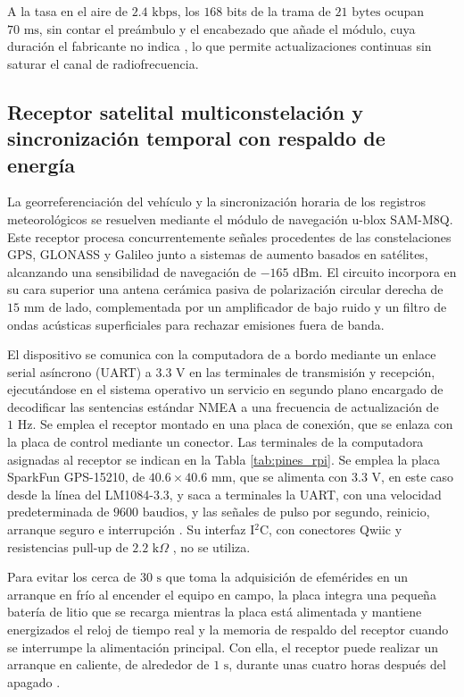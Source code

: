\documentclass[../../General.tex]{subfiles}
\begin{document}
A la tasa en el aire de $2.4\text{ kbps}$, los $168$ bits de la trama de $21\text{ bytes}$ ocupan $70\text{ ms}$, sin contar el preámbulo y el encabezado que añade el módulo, cuya duración el fabricante no indica \citep{ebyte_e220_900t30d}, lo que permite actualizaciones continuas sin saturar el canal de radiofrecuencia.

\subsection{Receptor satelital multiconstelación y sincronización temporal con respaldo de energía}

La georreferenciación del vehículo y la sincronización horaria de los registros meteorológicos se resuelven mediante el módulo de navegación u-blox SAM-M8Q. Este receptor procesa concurrentemente señales procedentes de las constelaciones GPS, GLONASS y Galileo junto a sistemas de aumento basados en satélites, alcanzando una sensibilidad de navegación de $-165\text{ dBm}$. El circuito incorpora en su cara superior una antena cerámica pasiva de polarización circular derecha de $15\text{ mm}$ de lado, complementada por un amplificador de bajo ruido y un filtro de ondas acústicas superficiales para rechazar emisiones fuera de banda.

El dispositivo se comunica con la computadora de a bordo mediante un enlace serial asíncrono (UART) a $3.3\text{ V}$ en las terminales de transmisión y recepción, ejecutándose en el sistema operativo un servicio en segundo plano encargado de decodificar las sentencias estándar NMEA a una frecuencia de actualización de $1\text{ Hz}$. Se emplea el receptor montado en una placa de conexión, que se enlaza con la placa de control mediante un conector.
Las terminales de la computadora asignadas al receptor se indican en la Tabla \ref{tab:pines_rpi}.
Se emplea la placa SparkFun GPS-15210, de $40.6 \times 40.6\text{ mm}$, que se alimenta con $3.3\text{ V}$, en este caso desde la línea del LM1084-3.3, y saca a terminales la UART, con una velocidad predeterminada de $9600\text{ baudios}$, y las señales de pulso por segundo, reinicio, arranque seguro e interrupción \citep{sparkfun_sam_m8q}. Su interfaz I$^2$C, con conectores Qwiic y resistencias pull-up de $2.2\text{ k}\Omega$ \citep{sparkfun_sam_m8q}, no se utiliza.

Para evitar los cerca de $30\text{ s}$ que toma la adquisición de efemérides en un arranque en frío al encender el equipo en campo, la placa integra una pequeña batería de litio que se recarga mientras la placa está alimentada y mantiene energizados el reloj de tiempo real y la memoria de respaldo del receptor cuando se interrumpe la alimentación principal. Con ella, el receptor puede realizar un arranque en caliente, de alrededor de $1\text{ s}$, durante unas cuatro horas después del apagado \citep{sparkfun_sam_m8q}.
\end{document}
